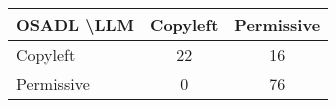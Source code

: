 \begin{tabular}{l|cc}\hline
	\textbf{OSADL \textbackslash LLM} & Copyleft & Permissive\\\hline
	Copyleft & 22 & 16\\
	Permissive & 0 & 76\\\hline
\end{tabular}
